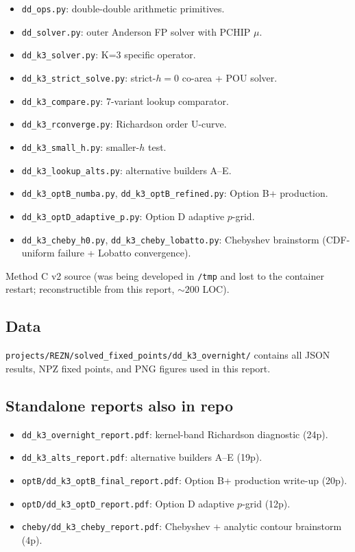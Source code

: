 \documentclass[11pt]{article}
\begin{document}
\begin{itemize}\itemsep1pt
  \item \texttt{dd\_ops.py}: double-double arithmetic primitives.
  \item \texttt{dd\_solver.py}: outer Anderson FP solver with PCHIP $\mu$.
  \item \texttt{dd\_k3\_solver.py}: K=3 specific operator.
  \item \texttt{dd\_k3\_strict\_solve.py}: strict-$h{=}0$ co-area + POU solver.
  \item \texttt{dd\_k3\_compare.py}: 7-variant lookup comparator.
  \item \texttt{dd\_k3\_rconverge.py}: Richardson order U-curve.
  \item \texttt{dd\_k3\_small\_h.py}: smaller-$h$ test.
  \item \texttt{dd\_k3\_lookup\_alts.py}: alternative builders A--E.
  \item \texttt{dd\_k3\_optB\_numba.py}, \texttt{dd\_k3\_optB\_refined.py}: Option B+ production.
  \item \texttt{dd\_k3\_optD\_adaptive\_p.py}: Option D adaptive $p$-grid.
  \item \texttt{dd\_k3\_cheby\_h0.py}, \texttt{dd\_k3\_cheby\_lobatto.py}:
        Chebyshev brainstorm (CDF-uniform failure + Lobatto convergence).
\end{itemize}

Method C v2 source (was being developed in \texttt{/tmp} and lost to
the container restart; reconstructible from this report, $\sim 200$ LOC).

\subsection{Data}

\texttt{projects/REZN/solved\_fixed\_points/dd\_k3\_overnight/} contains
all JSON results, NPZ fixed points, and PNG figures used in this report.

\subsection{Standalone reports also in repo}

\begin{itemize}\itemsep1pt
  \item \texttt{dd\_k3\_overnight\_report.pdf}: kernel-band Richardson
        diagnostic (24p).
  \item \texttt{dd\_k3\_alts\_report.pdf}: alternative builders A--E (19p).
  \item \texttt{optB/dd\_k3\_optB\_final\_report.pdf}: Option B+
        production write-up (20p).
  \item \texttt{optD/dd\_k3\_optD\_report.pdf}: Option D adaptive $p$-grid
        (12p).
  \item \texttt{cheby/dd\_k3\_cheby\_report.pdf}: Chebyshev + analytic
        contour brainstorm (4p).
\end{itemize}
\end{document}
